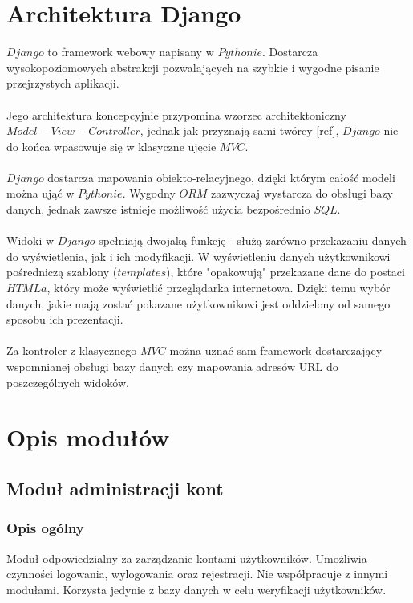 \documentclass[pdflatex,11pt]{../aghdoc_version2}
\begin{document}
\chapter{Architektura Django}
$Django$ to framework webowy napisany w $Pythonie$. Dostarcza wysokopoziomowych
abstrakcji pozwalających na szybkie i wygodne pisanie przejrzystych aplikacji. \\ \\
Jego architektura koncepcyjnie przypomina wzorzec architektoniczny $Model-View-Controller$,
jednak jak przyznają sami twórcy [ref], $Django$ nie do końca wpasowuje się w klasyczne
ujęcie $MVC$. \\ \\
$Django$ dostarcza mapowania obiekto-relacyjnego, dzięki którym całość modeli można ująć
w $Pythonie$. Wygodny $ORM$ zazwyczaj wystarcza do obsługi bazy danych, jednak zawsze
istnieje możliwość użycia bezpośrednio $SQL$. \\ \\
Widoki w $Django$ spełniają dwojaką funkcję - służą zarówno przekazaniu danych do
wyświetlenia, jak i ich modyfikacji. W wyświetleniu danych użytkownikowi pośredniczą
szablony ($templates$), które "opakowują" przekazane dane do postaci $HTMLa$, który może
wyświetlić przeglądarka internetowa. Dzięki temu wybór danych, jakie mają zostać pokazane
użytkownikowi jest oddzielony od samego sposobu ich prezentacji. \\ \\
Za kontroler z klasycznego $MVC$ można uznać sam framework dostarczający wspomnianej
obsługi bazy danych czy mapowania adresów URL do poszczególnych widoków.

\chapter{Opis modułów}
\label{cha:opis_modulow}

\section{Moduł administracji kont}
\subsection{Opis ogólny}
Moduł odpowiedzialny za zarządzanie kontami użytkowników. Umożliwia czynności
logowania, wylogowania oraz rejestracji. Nie współpracuje z innymi modułami. Korzysta
jedynie z bazy danych w celu weryfikacji użytkowników.
\end{document}
